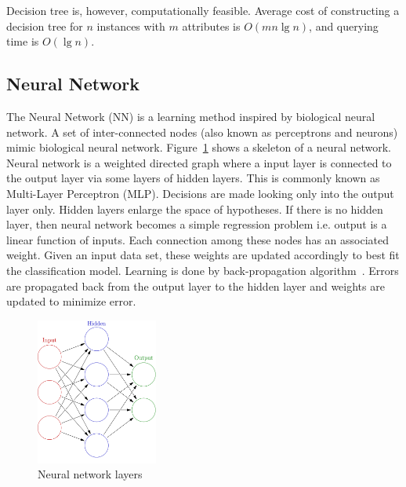 \documentclass[a4paper, 11pt, oneside]{book}
\begin{document}
Decision tree is, however, computationally feasible. Average cost of constructing a decision tree for $n$ instances with $m$ attributes is $O(mn \lg n)$, and querying time is $O(\lg n)$.

\subsection{Neural Network}
The Neural Network (NN) is a learning method inspired by biological neural network. A set of inter-connected nodes (also known as perceptrons and neurons) mimic biological neural network. Figure~\ref{fig:bg:nnlayer} shows a skeleton of a neural network. Neural network is a weighted directed graph where a input layer is connected to the output layer via some layers of hidden layers. This is commonly known as Multi-Layer Perceptron (MLP). Decisions are made looking only into the output layer only. Hidden layers enlarge the space of hypotheses. If there is no hidden layer, then neural network becomes a simple regression problem i.e. output is a linear function of inputs. Each connection among these nodes has an associated weight. Given an input data set, these weights are updated accordingly to best fit the classification model. Learning is done by back-propagation algorithm~\cite{raul96:nn}. Errors are propagated back from the output layer to the hidden layer and weights are updated to minimize error.
\begin{figure}[htbp]
    \begin{center}
        \includegraphics[width=4.0cm]{figs/nnlayers.png}
        \caption{Neural network layers}
        \label{fig:bg:nnlayer}
    \end{center}
\end{figure}
\end{document}
